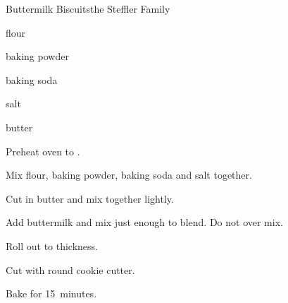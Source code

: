 \begin{recipe}{Buttermilk Biscuits}{the Steffler Family}{}

\begin{ingredients}
\item {} flour
\item {} baking powder
\item \tp{\half} baking soda
\item \tp{\half} salt
\item \tp{\half} butter
\item {} 
\end{ingredients}

\begin{directions}
\item Preheat oven to .
\item Mix flour, baking powder, baking soda and salt together.
\item Cut in butter and mix together lightly.
\item Add buttermilk and mix just enough to blend. Do not over mix.
\item Roll out to  thickness.
\item Cut with round cookie cutter.
\item Bake for 15~minutes.
\end{directions}

\end{recipe}

